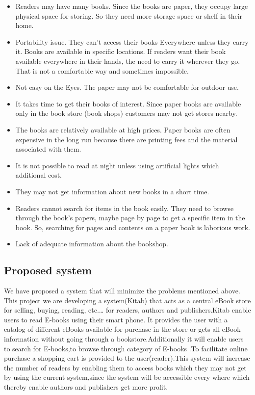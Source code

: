 \begin{itemize}
	\item Readers may have many books. Since the books are paper, they occupy large physical space for storing. So they need more storage space or shelf in their home.
	\item Portability issue. They can’t access their books Everywhere unless they carry it. Books are available in specific locations. If readers want their book available everywhere in their hands, the need to carry it wherever they go. That is not a comfortable way and sometimes impossible.
	\item Not easy on the Eyes. The paper may not be comfortable for outdoor use.
	\item It takes time to get their books of interest. Since paper books are available only in the book store (book shops) customers may not get stores nearby.
	\item The books are relatively available at high prices. Paper books are often expensive in the long run because there are printing fees and the material associated with them.
	\item It is not possible to read at night unless using artificial lights which additional cost.
	\item They may not get information about new books in a short time.
	\item Readers cannot search for items in the book easily. They need to browse through the book's papers, maybe page by page to get a specific item in the book. So, searching for pages and contents on a paper book is laborious work.
	\item Lack of adequate information about the bookshop.
\end{itemize}

		\subsection{Proposed system}

We have proposed a system that will minimize the problems mentioned above. This project we are developing  a system(Kitab) that acts as a central eBook store for selling, buying, reading, etc.… for readers, authors and publishers.Kitab enable users to read E-books using their smart phone. It provides the user with a catalog of different eBooks available for purchase in the store or gets all eBook information without going through a bookstore.Additionally it will enable users to search for E-books,to browse through category of E-books .To facilitate online purchase a shopping cart is provided to the user(reader).This system will increase the number of readers by enabling them to access books which they may not get by using the current system,since the system will be accessible every where which thereby enable authors and publishers get more profit.

